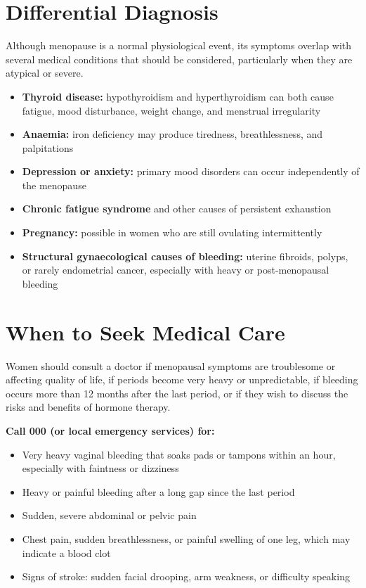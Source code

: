 \section*{Differential Diagnosis}
Although menopause is a normal physiological event, its symptoms overlap with several medical conditions that should be considered, particularly when they are atypical or severe.

\begin{itemize}
    \item \textbf{Thyroid disease:} hypothyroidism and hyperthyroidism can both cause fatigue, mood disturbance, weight change, and menstrual irregularity
    \item \textbf{Anaemia:} iron deficiency may produce tiredness, breathlessness, and palpitations
    \item \textbf{Depression or anxiety:} primary mood disorders can occur independently of the menopause
    \item \textbf{Chronic fatigue syndrome} and other causes of persistent exhaustion
    \item \textbf{Pregnancy:} possible in women who are still ovulating intermittently
    \item \textbf{Structural gynaecological causes of bleeding:} uterine fibroids, polyps, or rarely endometrial cancer, especially with heavy or post-menopausal bleeding
\end{itemize}

\section*{When to Seek Medical Care}
Women should consult a doctor if menopausal symptoms are troublesome or affecting quality of life, if periods become very heavy or unpredictable, if bleeding occurs more than 12 months after the last period, or if they wish to discuss the risks and benefits of hormone therapy.

\textbf{Call 000 (or local emergency services) for:}
\begin{itemize}
    \item Very heavy vaginal bleeding that soaks pads or tampons within an hour, especially with faintness or dizziness
    \item Heavy or painful bleeding after a long gap since the last period
    \item Sudden, severe abdominal or pelvic pain
    \item Chest pain, sudden breathlessness, or painful swelling of one leg, which may indicate a blood clot
    \item Signs of stroke: sudden facial drooping, arm weakness, or difficulty speaking
\end{itemize}

